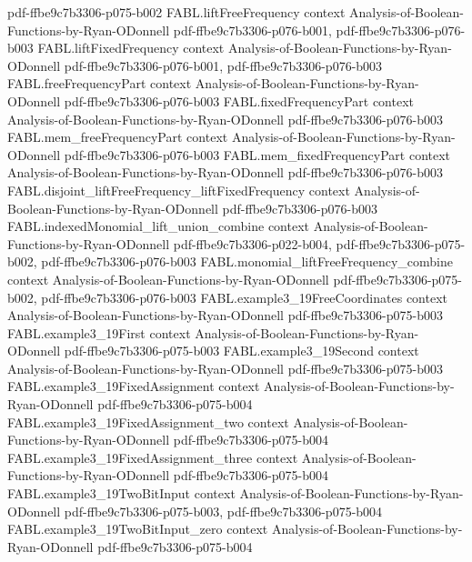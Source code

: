 \begin{theorem}
  {pdf-ffbe9c7b3306-p075-b002}
\proofstep
  {FABL.liftFreeFrequency}
  {context}
  {Analysis-of-Boolean-Functions-by-Ryan-ODonnell}
  {pdf-ffbe9c7b3306-p076-b001,
    pdf-ffbe9c7b3306-p076-b003}
\proofstep
  {FABL.liftFixedFrequency}
  {context}
  {Analysis-of-Boolean-Functions-by-Ryan-ODonnell}
  {pdf-ffbe9c7b3306-p076-b001,
    pdf-ffbe9c7b3306-p076-b003}
\proofstep
  {FABL.freeFrequencyPart}
  {context}
  {Analysis-of-Boolean-Functions-by-Ryan-ODonnell}
  {pdf-ffbe9c7b3306-p076-b003}
\proofstep
  {FABL.fixedFrequencyPart}
  {context}
  {Analysis-of-Boolean-Functions-by-Ryan-ODonnell}
  {pdf-ffbe9c7b3306-p076-b003}
\proofstep
  {FABL.mem_freeFrequencyPart}
  {context}
  {Analysis-of-Boolean-Functions-by-Ryan-ODonnell}
  {pdf-ffbe9c7b3306-p076-b003}
\proofstep
  {FABL.mem_fixedFrequencyPart}
  {context}
  {Analysis-of-Boolean-Functions-by-Ryan-ODonnell}
  {pdf-ffbe9c7b3306-p076-b003}
\proofstep
  {FABL.disjoint_liftFreeFrequency_liftFixedFrequency}
  {context}
  {Analysis-of-Boolean-Functions-by-Ryan-ODonnell}
  {pdf-ffbe9c7b3306-p076-b003}
\proofstep
  {FABL.indexedMonomial_lift_union_combine}
  {context}
  {Analysis-of-Boolean-Functions-by-Ryan-ODonnell}
  {pdf-ffbe9c7b3306-p022-b004,
    pdf-ffbe9c7b3306-p075-b002,
    pdf-ffbe9c7b3306-p076-b003}
\proofstep
  {FABL.monomial_liftFreeFrequency_combine}
  {context}
  {Analysis-of-Boolean-Functions-by-Ryan-ODonnell}
  {pdf-ffbe9c7b3306-p075-b002,
    pdf-ffbe9c7b3306-p076-b003}
\proofstep
  {FABL.example3_19FreeCoordinates}
  {context}
  {Analysis-of-Boolean-Functions-by-Ryan-ODonnell}
  {pdf-ffbe9c7b3306-p075-b003}
\proofstep
  {FABL.example3_19First}
  {context}
  {Analysis-of-Boolean-Functions-by-Ryan-ODonnell}
  {pdf-ffbe9c7b3306-p075-b003}
\proofstep
  {FABL.example3_19Second}
  {context}
  {Analysis-of-Boolean-Functions-by-Ryan-ODonnell}
  {pdf-ffbe9c7b3306-p075-b003}
\proofstep
  {FABL.example3_19FixedAssignment}
  {context}
  {Analysis-of-Boolean-Functions-by-Ryan-ODonnell}
  {pdf-ffbe9c7b3306-p075-b004}
\proofstep
  {FABL.example3_19FixedAssignment_two}
  {context}
  {Analysis-of-Boolean-Functions-by-Ryan-ODonnell}
  {pdf-ffbe9c7b3306-p075-b004}
\proofstep
  {FABL.example3_19FixedAssignment_three}
  {context}
  {Analysis-of-Boolean-Functions-by-Ryan-ODonnell}
  {pdf-ffbe9c7b3306-p075-b004}
\proofstep
  {FABL.example3_19TwoBitInput}
  {context}
  {Analysis-of-Boolean-Functions-by-Ryan-ODonnell}
  {pdf-ffbe9c7b3306-p075-b003,
    pdf-ffbe9c7b3306-p075-b004}
\proofstep
  {FABL.example3_19TwoBitInput_zero}
  {context}
  {Analysis-of-Boolean-Functions-by-Ryan-ODonnell}
  {pdf-ffbe9c7b3306-p075-b004}

\end{theorem}
